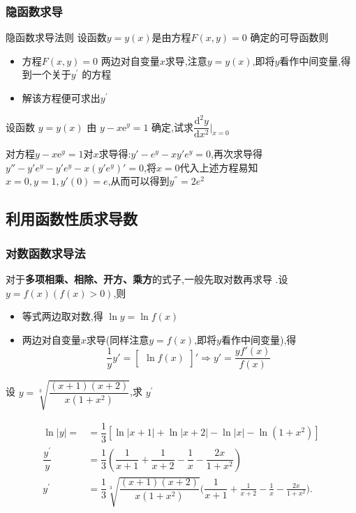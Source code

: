 \documentclass[8pt a4paper, oneside, UTF8]{ctexbook}  %
\begin{document}
\begin{sloppypar}
    \subsubsection{隐函数求导}
    \begin{defn}{隐函数求导法则}{}
        设函数$y=y(x)$是由方程$F(x,y)=0$ 确定的可导函数则
        \begin{itemize}
            \item 方程$F(x,y)=0$ 两边对自变量$x$求导,注意$y=y(x)$,即将$y$看作中间变量,得到一个关于$y^{\prime}$ 的方程
            \item 解该方程便可求出$y^{\prime}$
        \end{itemize}
    \end{defn}
    \begin{problem}
        设函数 $y=y(x)$ 由 $y-x\mathrm{e}^y=1$ 确定,试求$\dfrac{\mathrm{d}^2y}{\mathrm{d}x^2}\Bigg|_{x=0}$
    \end{problem}
    \begin{solution}
        对方程$y-x\mathrm{e}^y=1$对$x$求导得:$y' - e^y-xy'e^y=0$,再次求导得$y'' -y'e^y-y'e^{y}-x\left(y'e^{y}\right)'=0$,将$x=0$代入上述方程易知$x=0,y=1,y'(0)=e$,从而可以得到$y^{''}=2e^2$
    \end{solution}
    \subsection{利用函数性质求导数}
    \subsubsection{对数函数求导法}
    对于\textbf{多项相乘、相除、开方、乘方}的式子,一般先取对数再求导 .设$y=f(x)(f(x)>0)$,则
    \begin{itemize}
        \item 等式两边取对数,得 $\ln y=\ln f(x)$
        \item 两边对自变量$x$求导(同样注意$y=f(x)$,即将$y$看作中间变量),得
        $$
            \dfrac{1}{y}y'=\begin{bmatrix}\ln f(x)\end{bmatrix}'\Rightarrow y'=\frac{yf'(x)}{f(x)}\
        $$
    \end{itemize}
    \begin{problem}
        设 $y=\sqrt[3]{\dfrac{\left(x+1\right)\left(x+2\right)}{x\left(1+x^{2}\right)}}$,求 $y^\prime$
    \end{problem}
    \begin{solution}
        \begin{align*}
            \ln |y|= & = \dfrac{1}{3}[\ln| x+1 |+\ln| x+2 |-\ln| x |-\ln(1+x^{2})]   \\
            \dfrac{y^{\prime}}{y} & =\dfrac{1}{3}\left(\dfrac{1}{x+1}+\dfrac{1}{x+2}-\dfrac{1}{x}-\dfrac{2x}{1+x^{2}}\right)\\
            y^{\prime} & =\dfrac{1}{3}\sqrt[3]{\dfrac{(x+1)(x+2)}{x(1+x^{2})}}\Big(\dfrac{1}{x+1}+\frac{1}{x+2}-\frac{1}{x}-\frac{2x}{1+x^{2}}\Big).
        \end{align*}
    \end{solution}

\end{sloppypar}
\end{document}
